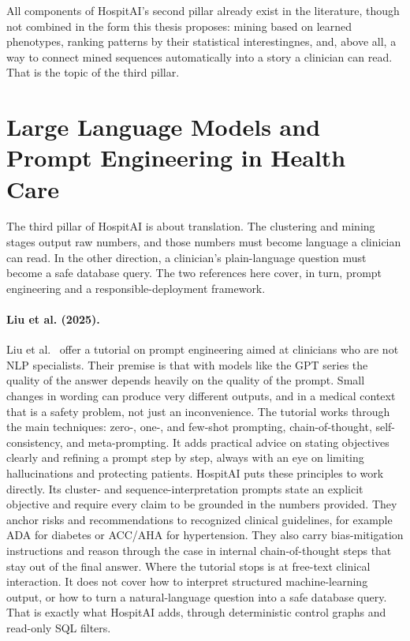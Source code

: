 All components of HospitAI's second pillar already exist in the literature, though not combined in the form this thesis proposes: mining based on learned phenotypes, ranking patterns by their statistical interestingnes, and, above all, a way to connect mined sequences automatically into a story a clinician can read.
That is the topic of the third pillar.

\section{Large Language Models and Prompt Engineering in Health Care}\label{sec:rw_llm}

The third pillar of HospitAI is about translation. The clustering and mining stages output raw numbers, and those numbers must become language a clinician can read. In the other direction, a clinician's plain-language question must become a safe database query.
The two references here cover, in turn, prompt engineering and a responsible-deployment framework.

\paragraph{Liu et al. (2025).}
Liu et al.~\cite{liu2025} offer a tutorial on prompt engineering aimed at clinicians who are not NLP specialists.
Their premise is that with models like the GPT series the quality of the answer depends heavily on the quality of the prompt. Small changes in wording can produce very different outputs, and in a medical context that is a safety problem, not just an inconvenience.
The tutorial works through the main techniques: zero-, one-, and few-shot prompting, chain-of-thought, self-consistency, and meta-prompting. It adds practical advice on stating objectives clearly and refining a prompt step by step, always with an eye on limiting hallucinations and protecting patients.
HospitAI puts these principles to work directly. Its cluster- and sequence-interpretation prompts state an explicit objective and require every claim to be grounded in the numbers provided. They anchor risks and recommendations to recognized clinical guidelines, for example ADA for diabetes or ACC/AHA for hypertension. They also carry bias-mitigation instructions and reason through the case in internal chain-of-thought steps that stay out of the final answer.
Where the tutorial stops is at free-text clinical interaction. It does not cover how to interpret structured machine-learning output, or how to turn a natural-language question into a safe database query. That is exactly what HospitAI adds, through deterministic control graphs and read-only SQL filters.


